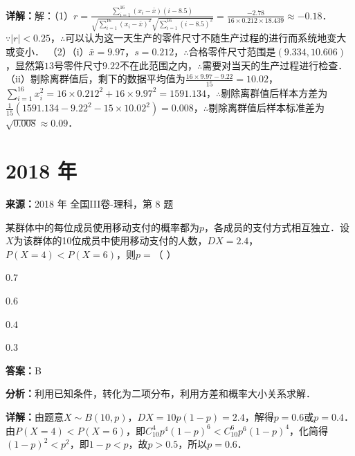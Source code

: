 \begin{question}[points=12]
\begin{solution}
\textbf{详解：}解：（1）$r=\frac{\sum_{i=1}^{16}(x_i-\bar{x})(i-8.5)}{\sqrt{\sum_{i=1}^{16}(x_i-\bar{x})^2}\sqrt{\sum_{i=1}^{16}(i-8.5)^2}}=\frac{-2.78}{16\times0.212\times18.439}\approx-0.18$．$\because|r|<0.25$，$\therefore$可以认为这一天生产的零件尺寸不随生产过程的进行而系统地变大或变小．
（2）（i）$\bar{x}=9.97$，$s=0.212$，$\therefore$合格零件尺寸范围是$(9.334,10.606)$，显然第$13$号零件尺寸$9.22$不在此范围之内，$\therefore$需要对当天的生产过程进行检查．
（ii）剔除离群值后，剩下的数据平均值为$\frac{16\times9.97-9.22}{15}=10.02$，$\sum_{i=1}^{16}x_i^2=16\times0.212^2+16\times9.97^2=1591.134$，$\therefore$剔除离群值后样本方差为$\frac{1}{15}(1591.134-9.22^2-15\times10.02^2)=0.008$，$\therefore$剔除离群值后样本标准差为$\sqrt{0.008}\approx0.09$．
\end{solution}
\end{question}

\section*{2018 年}

\begin{question}[points=5]
\textbf{来源：}2018 年 全国III卷-理科，第 8 题\par
某群体中的每位成员使用移动支付的概率都为$p$，各成员的支付方式相互独立．设$X$为该群体的10位成员中使用移动支付的人数，$DX=2.4$，$P(X=4)<P(X=6)$，则$p=$（ ）
\begin{choices}
  \item $0.7$
  \item $0.6$
  \item $0.4$
  \item $0.3$
\end{choices}
\begin{solution}
\textbf{答案：}B

\textbf{分析：}利用已知条件，转化为二项分布，利用方差和概率大小关系求解．

\textbf{详解：}由题意$X\sim B(10,p)$，$DX=10p(1-p)=2.4$，解得$p=0.6$或$p=0.4$．由$P(X=4)<P(X=6)$，即$C_{10}^4 p^4(1-p)^6 < C_{10}^6 p^6(1-p)^4$，化简得$(1-p)^2 < p^2$，即$1-p < p$，故$p>0.5$，所以$p=0.6$．
\end{solution}
\end{question}

